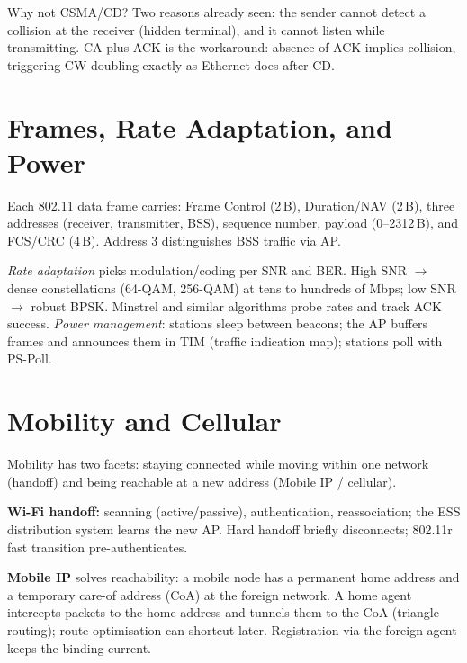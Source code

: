 Why not CSMA/CD? Two reasons already seen: the sender cannot detect a collision at the receiver (hidden terminal), and it cannot listen while transmitting. CA plus ACK is the workaround: absence of ACK implies collision, triggering CW doubling exactly as Ethernet does after CD.

\section{Frames, Rate Adaptation, and Power}\label{sec:frames}
Each 802.11 data frame carries: Frame Control (2\,B), Duration/NAV (2\,B), three addresses (receiver, transmitter, BSS), sequence number, payload (0--2312\,B), and FCS/CRC (4\,B). Address 3 distinguishes BSS traffic via AP.

\emph{Rate adaptation} picks modulation/coding per SNR and BER. High SNR $\to$ dense constellations (64-QAM, 256-QAM) at tens to hundreds of Mbps; low SNR $\to$ robust BPSK. Minstrel and similar algorithms probe rates and track ACK success. \emph{Power management}: stations sleep between beacons; the AP buffers frames and announces them in TIM (traffic indication map); stations poll with PS-Poll.

\section{Mobility and Cellular}\label{sec:mobility}
Mobility has two facets: staying connected while moving within one network (handoff) and being reachable at a new address (Mobile IP / cellular).

\textbf{Wi-Fi handoff:} scanning (active/passive), authentication, reassociation; the ESS distribution system learns the new AP. Hard handoff briefly disconnects; 802.11r fast transition pre-authenticates.

\textbf{Mobile IP} solves reachability: a mobile node has a permanent home address and a temporary care-of address (CoA) at the foreign network. A home agent intercepts packets to the home address and tunnels them to the CoA (triangle routing); route optimisation can shortcut later. Registration via the foreign agent keeps the binding current.

